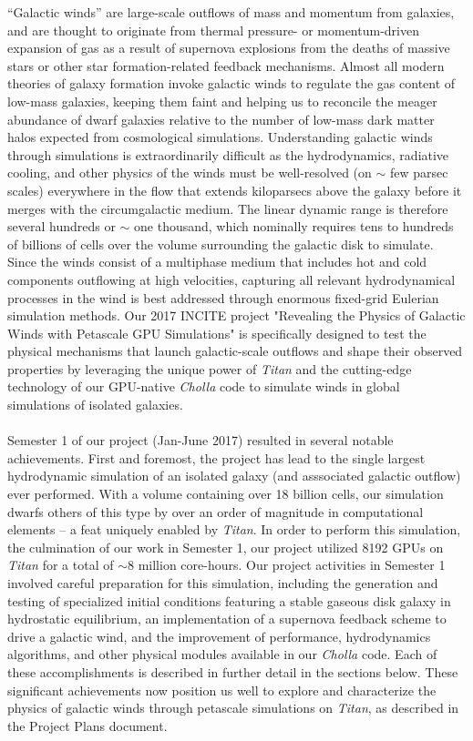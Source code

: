 \documentclass[11pt,letterpaper,english]{article}
\begin{document}
``Galactic winds'' are large-scale outflows of mass and momentum from galaxies, and are thought to originate from thermal pressure- or momentum-driven expansion of gas as a result of supernova explosions
from the deaths of massive stars or other star formation-related feedback mechanisms. Almost all modern
theories of galaxy formation invoke galactic winds to regulate the gas content of low-mass galaxies,
keeping them faint and helping us to reconcile the meager abundance of dwarf galaxies relative to the number of low-mass dark matter halos expected from cosmological simulations. 
Understanding galactic winds through simulations is extraordinarily difficult as the
hydrodynamics, radiative cooling, and other physics of the winds must be well-resolved (on $\sim$ few parsec scales) everywhere in the flow that extends kiloparsecs above the galaxy before it merges with the circumgalactic medium. The linear dynamic range is therefore several hundreds or $\sim$ one thousand, which nominally requires tens to hundreds of billions of cells over the volume surrounding the galactic disk
to simulate. Since the winds consist of a multiphase medium that includes hot and cold components outflowing at high velocities, capturing all relevant hydrodynamical processes in the wind is best addressed through enormous fixed-grid Eulerian simulation methods.
Our 2017 INCITE project "Revealing the Physics of Galactic Winds with Petascale GPU Simulations" is specifically designed to test the physical mechanisms that launch galactic-scale outflows and shape
their observed properties by leveraging
the unique power of \textit{Titan} and the cutting-edge technology of our GPU-native \textit{Cholla}
code to simulate winds in global simulations of isolated galaxies.
~\\~\\
Semester 1 of our project (Jan-June 2017) resulted in several notable achievements. First and foremost, the project has lead to the single largest hydrodynamic simulation of an isolated galaxy (and asssociated galactic outflow) ever performed. With a volume containing over 18 billion cells, our simulation dwarfs others of this type by over an order of magnitude in computational elements -- a feat uniquely enabled by \textit{Titan}. In order to perform this simulation, the culmination of our work in Semester 1, our project utilized 8192 GPUs on \textit{Titan} for a total of $\sim$8 million core-hours. Our project activities in Semester 1 involved careful preparation for this simulation, including the generation and testing of specialized initial conditions featuring a stable gaseous disk galaxy in hydrostatic equilibrium, an implementation of a supernova feedback scheme to drive a galactic wind, and the improvement of performance,
hydrodynamics algorithms, and other physical modules available in our \textit{Cholla} code. Each of these accomplishments is described in further detail in the sections below. These significant achievements
now position us well to explore and characterize the physics of galactic winds through petascale simulations
on \textit{Titan}, as described in the Project Plans document.
\end{document}
